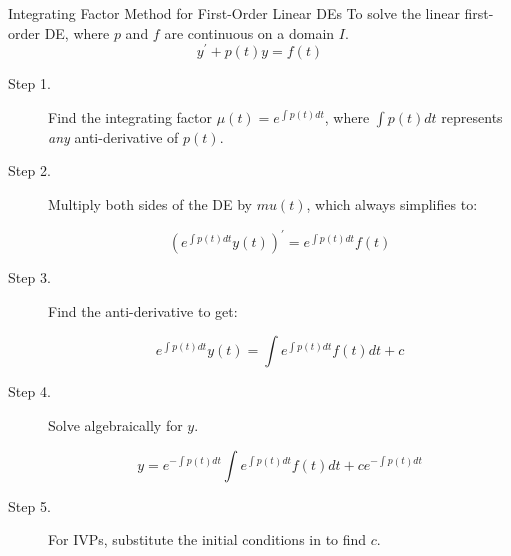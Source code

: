 \documentclass{beamer}
\begin{document}
\begin{frame}
\begin{block}{Integrating Factor Method for First-Order Linear DEs}
\small
To solve the linear first-order DE, where $p$ and $f$ are continuous on a domain $I$.
\begin{equation*}
y^\prime + p(t) y = f(t)
\end{equation*}
\begin{description}
\item[Step 1.] Find the integrating factor $\mu(t) = e^{\int p(t) dt}$, where $\int p(t) dt$ represents \emph{any} anti-derivative of $p(t)$.
\item[Step 2.] Multiply both sides of the DE by $mu(t)$, which always simplifies to:

\vspace{-2mm}
\begin{equation*}
{\left(e^{\int p(t) dt} y(t)\right)}^\prime = e^{\int p(t) dt} f(t)
\end{equation*}
\item[Step 3.] Find the anti-derivative to get:

\vspace{-2mm}
\begin{equation*}
e^{\int p(t) dt} y(t) = \int e^{\int p(t) dt} f(t) dt +c
\end{equation*}
\item[Step 4.] Solve algebraically for $y$.

\vspace{-2mm}
\begin{equation*}
y = e^{-\int p(t) dt} \int e^{\int p(t) dt} f(t) dt + c e^{-\int p(t) dt}
\end{equation*}
\item[Step 5.] For IVPs, substitute the initial conditions in to find $c$.
\end{description}
\end{block}
\end{frame}
\end{document}
